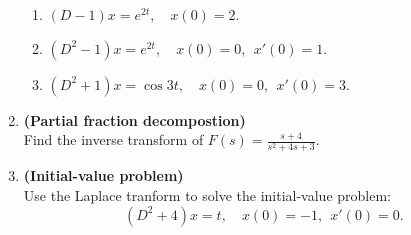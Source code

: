 \documentclass[12pt]{article}
\begin{document}
\begin{enumerate}[1.]
      \begin{enumerate}
        \setlength{\itemsep}{2mm}
      \item $(D - 1) x = e^{2t}, \quad x(0) =2$.
      \item $(D^2 -1) x = e^{2t}, \quad x(0) = 0, \ \ x'(0) = 1$.
      \item $(D^2 + 1) x = \cos 3t, \quad x(0)=0, \ \ x'(0) = 3$.
      \end{enumerate}

     \item \textbf{(Partial fraction decompostion)} \\
      Find the inverse transform of $F(s) = \displaystyle \frac{s+4}{s^2
         + 4s +3}$.

      \item \textbf{(Initial-value problem)}\\
       Use the Laplace tranform to solve the initial-value problem:
       \[
         (D^2 + 4) x = t, \quad x(0)= -1,\ \  x'(0) = 0.
         \]
     


\end{enumerate}

\bigskip

\end{document}
